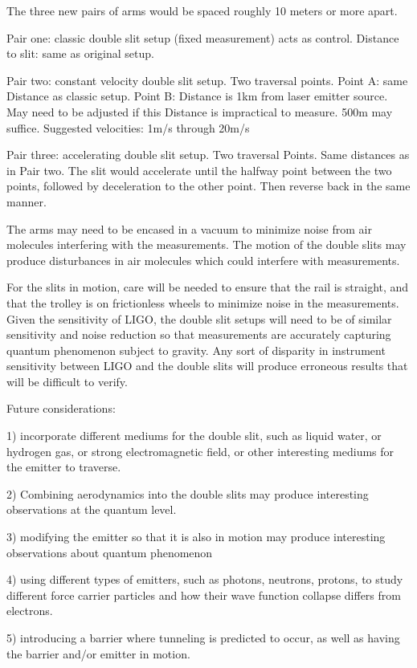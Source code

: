 \documentclass{article}
\begin{document}
The three new pairs of arms would be spaced roughly 10 meters or more apart.

Pair one: classic double slit setup (fixed measurement) acts as control. Distance to slit: same as original setup.

Pair two: constant velocity double slit setup. Two traversal points. Point A: same Distance as classic setup. Point B: Distance is 1km from laser emitter source. May need to be adjusted if this Distance is impractical to measure. 500m may suffice. Suggested velocities: 1m/s through 20m/s

Pair three: accelerating double slit setup. Two traversal Points. Same distances as in Pair two. The slit would accelerate until the halfway point between the two points, followed by deceleration to the other point. Then reverse back in the same manner. 

The arms may need to be encased in a vacuum to minimize noise from air molecules interfering with the measurements. The motion of the double slits may produce disturbances in air molecules which could interfere with measurements. 

For the slits in motion, care will be needed to ensure that the rail is straight, and that the trolley is on frictionless wheels to minimize noise in the measurements. Given the sensitivity of LIGO, the double slit setups will need to be of similar sensitivity and noise reduction so that measurements are accurately capturing quantum phenomenon subject to gravity. Any sort of disparity in instrument sensitivity between LIGO and the double slits will produce erroneous results that will be difficult to verify. 

Future considerations: 

1) incorporate different mediums for the double slit, such as liquid water, or hydrogen gas, or strong electromagnetic field, or other interesting mediums for the emitter to traverse. 

2) Combining aerodynamics into the double slits may produce interesting observations at the quantum level. 

3) modifying the emitter so that it is also in motion may produce interesting observations about quantum phenomenon 

4) using different types of emitters, such as photons, neutrons, protons, to study different force carrier particles and how their wave function collapse differs from electrons. 

5) introducing a barrier where tunneling is predicted to occur, as well as having the barrier and/or emitter in motion. 
\end{document}
